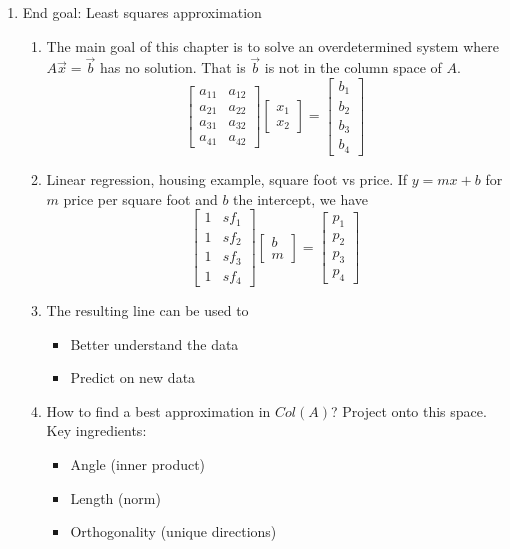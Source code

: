\documentclass{article}
\begin{document}
\begin{enumerate}

\item End goal: Least squares approximation
\begin{enumerate}
\item The main goal of this chapter is to solve an overdetermined system where $A\vec{x} =\vec{b}$ has no solution. That is $\vec{b}$ is not in the column space of $A$.
\[
\left[
\begin{array}{cc}
a_{11} & a_{12} \\
a_{21} & a_{22} \\
a_{31} & a_{32} \\
a_{41} & a_{42} 
\end{array}
\right]
\left[
\begin{array}{c}
x_1 \\ x_2
\end{array}
\right]
= 
\left[
\begin{array}{c}
b_1 \\ b_2 \\ b_3 \\ b_4
\end{array}
\right]
\]
\item Linear regression, housing example, square foot vs price. If $y=mx+b$ for $m$ price per square foot and $b$ the intercept, we have
\[
\left[
\begin{array}{cc}
1 & sf_1 \\
1 & sf_2 \\
1 & sf_3 \\
1 & sf_4 
\end{array}
\right]
\left[
\begin{array}{c}
b \\ m
\end{array}
\right]
= 
\left[
\begin{array}{c}
p_1 \\ p_2 \\ p_3 \\ p_4
\end{array}
\right]
\]
\item The resulting line can be used to 
\begin{itemize}
\item Better understand the data
\item Predict on new data
\end{itemize}

\item How to find a best approximation in $Col(A)$? Project onto this space. Key ingredients:
\begin{itemize}
\item Angle (inner product)
\item Length (norm)
\item Orthogonality (unique directions)
\end{itemize}
\end{enumerate}

\end{enumerate}
\end{document}
